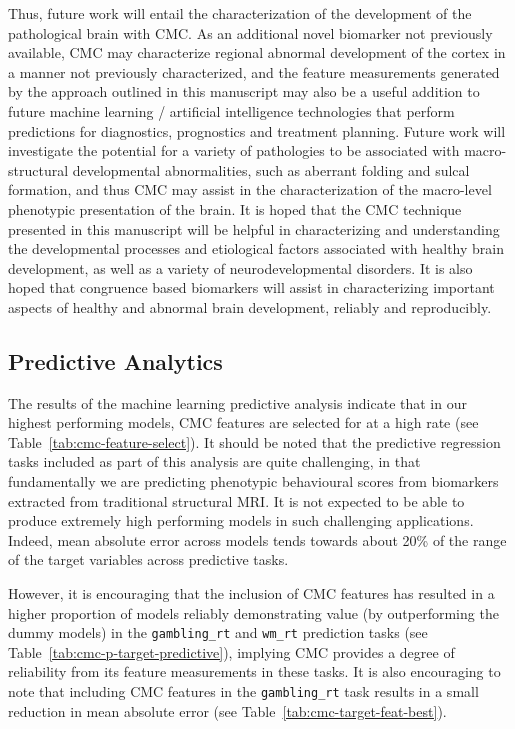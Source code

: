 \documentclass{article}
\begin{document}
Thus, future work will entail the characterization of the development of the
pathological brain with CMC\@. As an additional novel biomarker not previously
available, CMC may characterize regional abnormal development of the cortex
in a manner not previously characterized, and the feature measurements
generated by the approach outlined in this manuscript may also be a useful
addition to future machine learning / artificial intelligence technologies
that perform predictions for diagnostics, prognostics and treatment planning.
Future work will investigate the potential for a variety of pathologies to be
associated with macro-structural developmental abnormalities, such as
aberrant folding and sulcal formation, and thus CMC may assist in the
characterization of the macro-level phenotypic presentation of the brain. It
is hoped that the CMC technique presented in this manuscript will be helpful
in characterizing and understanding the developmental processes and
etiological factors associated with healthy brain development, as well as a
variety of neurodevelopmental disorders. It is also hoped that congruence
based biomarkers will assist in characterizing important aspects of healthy
and abnormal brain development, reliably and reproducibly.


\subsection{Predictive Analytics}


The results of the machine learning predictive analysis indicate that in our
highest performing models, CMC features are selected for at a high rate (see
Table~\ref{tab:cmc-feature-select}). It should be noted that the predictive
regression tasks included as part of this analysis are quite challenging, in
that fundamentally we are predicting phenotypic behavioural scores from
biomarkers extracted from traditional structural MRI\@. It is not expected to
be able to produce extremely high performing models in such challenging
applications. Indeed, mean absolute error across models tends towards about
20\% of the range of the target variables across predictive tasks.

However, it is encouraging that the inclusion of CMC features has resulted in
a higher proportion of models reliably demonstrating value (by outperforming
the dummy models) in the \texttt{gambling\_rt} and \texttt{wm\_rt} prediction
tasks (see Table~\ref{tab:cmc-p-target-predictive}), implying CMC provides a
degree of reliability from its feature measurements in these tasks. It is
also encouraging to note that including CMC features in the
\texttt{gambling\_rt} task results in a small reduction in mean absolute
error (see Table~\ref{tab:cmc-target-feat-best}).
\end{document}
